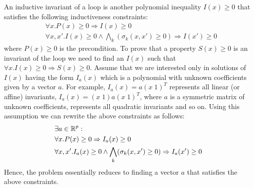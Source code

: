 An inductive invariant of a loop is another polynomial inequality $I(x) \ge 0$ 
that satisfies the following inductiveness constraints:
%
\begin{align}
& \forall x. P(x) \ge 0 \Rightarrow I(x) \ge 0 \\
& \forall x,x'. I(x) \ge 0 \wedge \bigwedge_k (\sigma_k(x,x') \ge 0) \Rightarrow  I(x') \ge 0
\end{align}
%
where $P(x) \ge 0$ is the precondition.
To prove that a property $S(x) \ge 0$ is an invariant of the loop we need to find an $I(x)$ such that
$\forall x. I(x) \ge 0 \Rightarrow S(x) \ge 0$.
Assume that we are interested only in solutions of $I(x)$ having the form $I_a(x)$ which is a polynomial with unknown coefficients given by a vector $a$. 
For example, $I_a(x) = a (x \; 1)^T$ represents all linear (or affine) invariants, 
$I_a(x) = (x \; 1) a (x \; 1)^T$, where $a$ is a symmetric matrix of unknown 
coefficients, represents all quadratic invariants  and so on. 
Using this assumption we can rewrite the above constraints as follows:
%
\begin{align}
& \nonumber \exists a \in \real^p:  \\
& \forall x. P(x) \ge 0 \Rightarrow I_a(x) \ge 0  \label{eq:template1}\\
& \forall x,x'. I_a(x) \ge 0  \wedge \bigwedge_k (\sigma_k(x,x') \ge 0) \Rightarrow  I_a(x') \ge 0 \label{eq:template2}
\end{align}
%
Hence,  the problem essentially reduces to finding a vector $a$ that satisfies
the above constraints.

